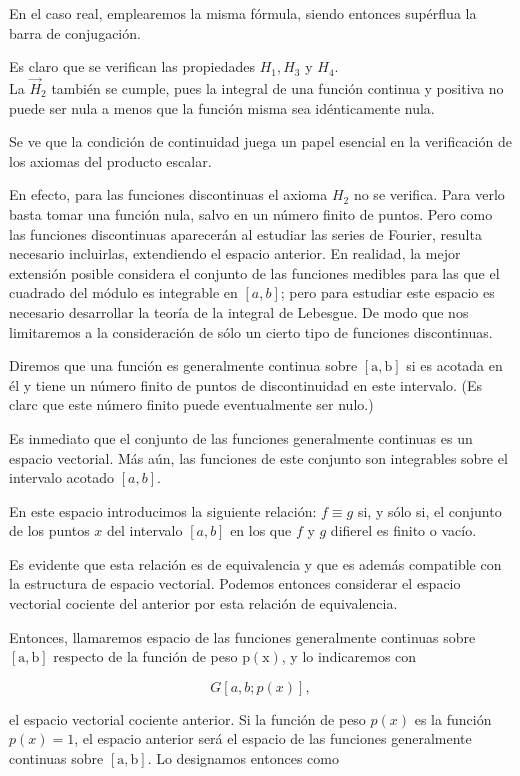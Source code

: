 \documentclass[10pt]{article}
\theoremstyle{plain}
\theoremstyle{definition}
\theoremstyle{remark}
\begin{document}
En el caso real, emplearemos la misma fórmula, siendo entonces supérflua la barra de conjugación.

Es claro que se verifican las propiedades $H_{1}, H_{3}$ y $H_{4}$.\\
La $\vec{H}_{2}$ también se cumple, pues la integral de una función continua y positiva no puede ser nula a menos que la función misma sea idénticamente nula.

Se ve que la condición de continuidad juega un papel esencial en la verificación de los axiomas del producto escalar.

En efecto, para las funciones discontinuas el axioma $H_{2}$ no se verifica. Para verlo basta tomar una función nula, salvo en un número finito de puntos. Pero como las funciones discontinuas aparecerán al estudiar las series de Fourier, resulta necesario incluirlas, extendiendo el espacio anterior. En realidad, la mejor extensión posible considera el conjunto de las funciones medibles para las que el cuadrado del módulo es integrable en $[a, b]$; pero para estudiar este espacio es necesario desarrollar la teoría de la integral de Lebesgue. De modo que nos limitaremos a la consideración de sólo un cierto tipo de funciones discontinuas.

Diremos que una función es generalmente continua sobre $[\mathrm{a}, \mathrm{b}]$ si es acotada en él y tiene un número finito de puntos de discontinuidad en este intervalo. (Es clarc que este número finito puede eventualmente ser nulo.)

Es inmediato que el conjunto de las funciones generalmente continuas es un espacio vectorial. Más aún, las funciones de este conjunto son integrables sobre el intervalo acotado $[a, b]$.

En este espacio introducimos la siguiente relación: $f \equiv g$ si, y sólo si, el conjunto de los puntos $x$ del intervalo $[a, b]$ en los que $f$ y $g$ difierel es finito o vacío.

Es evidente que esta relación es de equivalencia y que es además compatible con la estructura de espacio vectorial. Podemos entonces considerar el espacio vectorial cociente del anterior por esta relación de equivalencia.

Entonces, llamaremos espacio de las funciones generalmente continuas sobre $[\mathrm{a}, \mathrm{b}]$ respecto de la función de peso $\mathrm{p}(\mathrm{x})$, y lo indicaremos con

$$
G[a, b ; p(x)],
$$

el espacio vectorial cociente anterior. Si la función de peso $p(x)$ es la función $p(x)=1$, el espacio anterior será el espacio de las funciones generalmente continuas sobre $[\mathrm{a}, \mathrm{b}]$. Lo designamos entonces como
\end{document}
